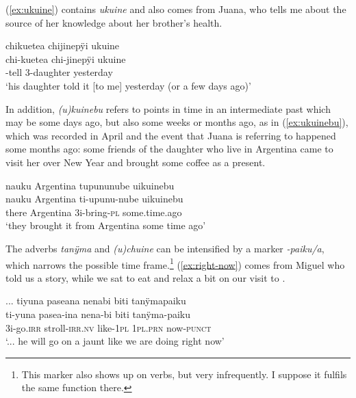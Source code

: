 (\ref{ex:ukuine}) contains \textit{ukuine} and also comes from Juana, who tells me about the source of her knowledge about her brother’s health.

\ea\label{ex:ukuine}
\begingl
\glpreamble chikuetea chijinepÿi ukuine\\
\gla chi-kuetea chi-jinepÿi ukuine\\
-tell 3-daughter yesterday\\
\glft ‘his daughter told it [to me] yesterday (or a few days ago)’
\endgl
\trailingcitation{[jxx-e150925l-1.124]}
\xe

In addition, \textit{(u)kuinebu} refers to points in time in an intermediate past which may be some days ago, but also some weeks or months ago, as in (\ref{ex:ukuinebu}), which was recorded in April and the event that Juana is referring to happened some months ago: some friends of the daughter who live in Argentina came to visit her over New Year and brought some coffee as a present.

\ea\label{ex:ukuinebu}
\begingl
\glpreamble nauku Argentina tupununube uikuinebu\\
\gla nauku Argentina ti-upunu-nube uikuinebu\\
\glb there Argentina 3i-bring-\textsc{pl} some.time.ago\\
\glft ‘they brought it  from Argentina some time ago’
\endgl
\trailingcitation{[jxx-e120430l-4.28]}
\xe


The adverbs \textit{tanÿma} and \textit{(u)chuine} can be intensified by a marker \textit{-paiku/a}, which narrows the possible time frame.\footnote{This marker also shows up on verbs, but very infrequently. I suppose it fulfils the same function there.} (\ref{ex:right-now}) comes from Miguel who told us a story, while we sat to eat and relax a bit on our visit to .

\ea\label{ex:right-now}
\begingl
\glpreamble ... tiyuna paseana nenabi biti tanÿmapaiku\\
\gla ti-yuna pasea-ina nena-bi biti tanÿma-paiku\\
\glb 3i-go.\textsc{irr} stroll-\textsc{irr.nv} like-1\textsc{pl} 1\textsc{pl.prn} now-\textsc{punct}\\
\glft ‘... he will go on a jaunt like we are doing right now’
\endgl
{}
\xe



